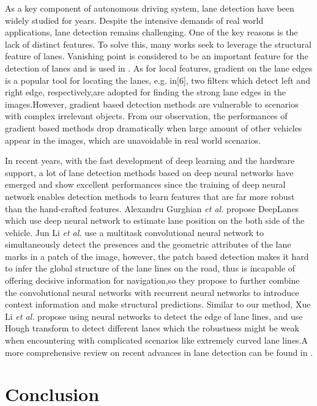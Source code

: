 \documentclass[10pt,twocolumn,letterpaper]{article}
\begin{document}
As a key component of autonomous driving system, lane detection have been widely studied for years.  Despite the intensive demands of real world applications, lane detection remains challenging.  One of the key reasons is the lack of distinct features. To solve this, many works seek to leverage the structural feature of lanes. Vanishing point is considered to be an important feature for the detection of lanes and is used in \cite{9_,16_,19_}.  As for local features, gradient on the lane edges is a popular tool for locating the lanes, e.g.  in[6], two filters which detect left and right edge, respectively,are adopted for finding the strong lane edges in the images.However, gradient based detection methods are vulnerable to scenarios with complex irrelevant objects.  From our observation, the performances of gradient based methods drop dramatically when large amount of other vehicles appear in the images, which are unavoidable in real world scenarios.

In recent years, with the fast development of deep learning and the hardware support, a lot of lane detection methods based on deep neural networks have emerged and show excellent  performances  since  the  training  of  deep  neural network enables detection methods to learn features that are far more robust than the hand-crafted features.  Alexandru Gurghian \textit{et al.} propose DeepLanes which use deep neural network to estimate lane position on the both side of the vehicle.   Jun Li \textit{et al.} use a multitask convolutional neural network to simultaneously detect the presences and the geometric attributes of the lane marks in a patch of the image,  however,  the  patch  based  detection  makes  it  hard  to infer the global structure of the lane lines on the road, thus is incapable of offering decisive information for navigation,so they propose to further combine the convolutional neural networks with recurrent neural networks to introduce context information and make structural predictions. Similar to our method,  Xue  Li \textit{et al.} propose  using  neural  networks to detect the edge of lane lines, and use Hough transform to detect different lanes which the robustness might be weak  when  encountering  with  complicated  scenarios  like extremely curved lane lines.A more comprehensive review on recent advances in lane detection can be found in \cite{13_}.

\section{Conclusion}
\end{document}
